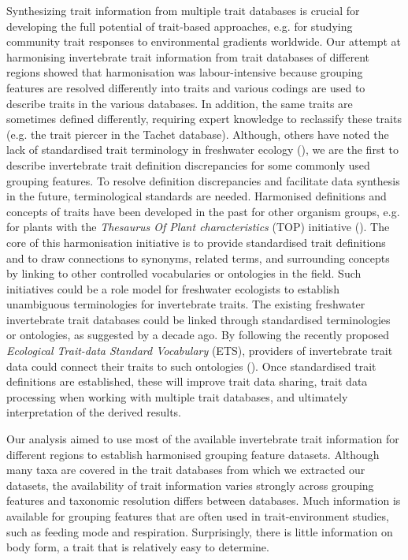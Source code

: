 \documentclass{article}
\begin{document}
Synthesizing trait information from multiple trait databases is crucial for developing the full potential of trait-based approaches, e.g. for studying community trait responses to environmental gradients worldwide. Our attempt at harmonising invertebrate trait information from trait databases of different regions showed that harmonisation was labour-intensive because grouping features are resolved differently into traits and various codings are used to describe traits in the various databases. In addition, the same traits are sometimes defined differently, requiring expert knowledge to reclassify these traits (e.g. the trait piercer in the Tachet database). Although, others have noted the lack of standardised trait terminology in freshwater ecology (\cite{baird_toward_2011, brink_traits-based_2011}), we are the first to describe invertebrate trait definition discrepancies for some commonly used grouping features. To resolve definition discrepancies and facilitate data synthesis in the future, terminological standards are needed. Harmonised definitions and concepts of traits have been developed in the past for other organism groups, e.g. for plants with the \textit{Thesaurus Of Plant characteristics} (TOP) initiative (\cite{garnier_towards_2017}). The core of this harmonisation initiative is to provide standardised trait definitions and to draw connections to synonyms, related terms, and surrounding concepts by linking to other controlled vocabularies or ontologies in the field. Such initiatives could be a role model for freshwater ecologists to establish unambiguous terminologies for invertebrate traits. The existing freshwater invertebrate trait databases could be linked through standardised terminologies or ontologies, as suggested by \citet{baird_toward_2011} a decade ago. By following the recently proposed \textit{Ecological Trait-data Standard Vocabulary} (ETS), providers of invertebrate trait data could connect their traits to such ontologies (\cite{schneider_towards_2019}). Once standardised trait definitions are established, these will improve trait data sharing, trait data processing when working with multiple trait databases, and ultimately interpretation of the derived results. 

Our analysis aimed to use most of the available invertebrate trait information for different regions to establish harmonised grouping feature datasets. Although many taxa are covered in the trait databases from which we extracted our datasets, the availability of trait information varies strongly across grouping features and taxonomic resolution differs between databases. Much information is available for grouping features that are often used in trait-environment studies, such as feeding mode and respiration. Surprisingly, there is little information on body form, a trait that is relatively easy to determine. 
\end{document}
